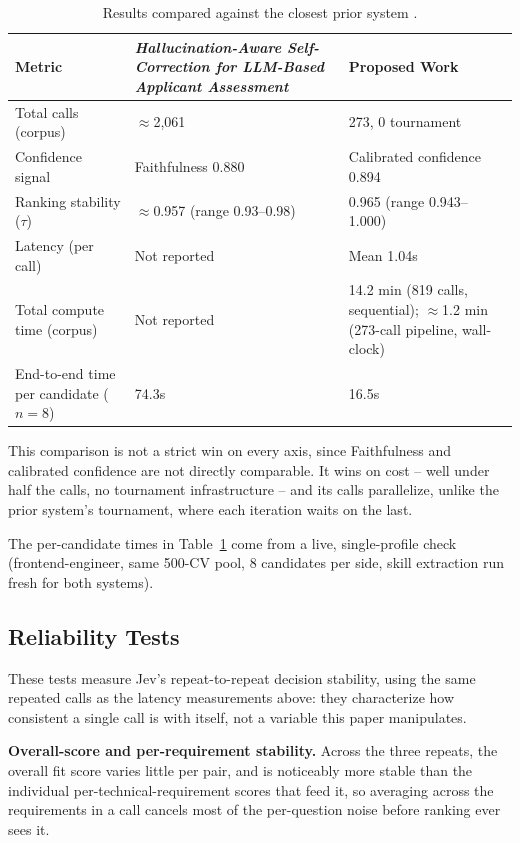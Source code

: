 \documentclass[journal]{IEEEtran}
\begin{document}
\begin{table}[H]
\caption{Results compared against the closest prior system \cite{ref2}.}
\label{tab_comparison_results}
\centering
\scriptsize
\setlength{\tabcolsep}{4.5pt}
\begin{tabular}{p{0.8in}p{1.05in}p{1.15in}}
\hline
Metric & \emph{Hallucination-Aware Self-Correction for LLM-Based Applicant Assessment} \cite{ref2} & Proposed Work\\
\hline
Total calls (corpus) & $\approx$2{,}061 & 273, 0 tournament\\
Confidence signal & Faithfulness 0.880 & Calibrated confidence 0.894\\
Ranking stability ($\tau$) & $\approx$0.957 (range 0.93--0.98) & 0.965 (range 0.943--1.000)\\
Latency (per call) & Not reported & Mean 1.04s\\
Total compute time (corpus) & Not reported & 14.2 min (819 calls, sequential); $\approx$1.2 min (273-call pipeline, wall-clock)\\
End-to-end time per candidate ($n=8$) & 74.3s & 16.5s\\
\hline
\end{tabular}
\end{table}
This comparison is not a strict win on every axis, since Faithfulness and calibrated confidence are not directly comparable. It wins on cost -- well under half the calls, no tournament infrastructure -- and its calls parallelize, unlike the prior system's tournament, where each iteration waits on the last.

The per-candidate times in Table~\ref{tab_comparison_results} come from a live, single-profile check (frontend-engineer, same 500-CV pool, 8 candidates per side, skill extraction run fresh for both systems).

\subsection{Reliability Tests}
These tests measure Jev's repeat-to-repeat decision stability, using the same repeated calls as the latency measurements above: they characterize how consistent a single call is with itself, not a variable this paper manipulates.

\textbf{Overall-score and per-requirement stability.} Across the three repeats, the overall fit score varies little per pair, and is noticeably more stable than the individual per-technical-requirement scores that feed it, so averaging across the requirements in a call cancels most of the per-question noise before ranking ever sees it.
\end{document}
